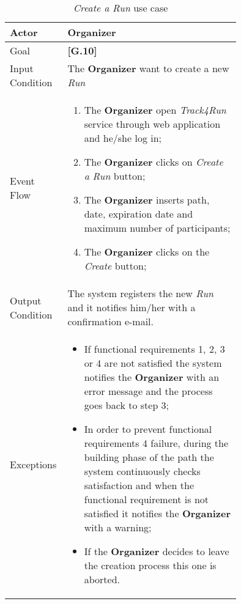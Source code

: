 \begin{center}
\begin{table}
\begin{tabular}{ | l | p{0.75\linewidth} | }
  \hline
    Actor & \textbf{Organizer} \\ \hline
    Goal & \textbf{[G.10]} \\ \hline
    Input Condition & The \textbf{Organizer} want to create a new \textit{Run} \\ \hline
    Event Flow & \begin{minipage}[t]{0.7\textwidth}
      \begin{enumerate}
        \item The \textbf{Organizer} open \textit{Track4Run} service through web application and he/she log in;
        \item The \textbf{Organizer} clicks on \textit{Create a Run} button;
        \item The \textbf{Organizer} inserts path, date, expiration date and maximum number of participants;
        \item The \textbf{Organizer} clicks on the \textit{Create} button;
      \end{enumerate}
    \smallskip
  \end{minipage} \\ \hline
  Output Condition & The system registers the new \textit{Run} and it notifies him/her with a confirmation e-mail. \\ \hline
  Exceptions & \begin{minipage}[t]{0.7\textwidth}
    \begin{itemize}
      \smallskip
      \item If functional requirements 1, 2, 3 or 4 are not satisfied the system notifies the \textbf{Organizer} with an error message and the process goes back to step 3;
      \item In order to prevent functional requirements 4 failure, during the building phase of the path the system continuously checks satisfaction and when the functional requirement is not satisfied it notifies the \textbf{Organizer} with a warning;
      \item If the \textbf{Organizer} decides to leave the creation process this one is aborted.
    \end{itemize}
    \smallskip
  \end{minipage}  \\ \hline
\end{tabular}
\caption{\textit{Create a Run} use case}
\label{table:createRunTable}
\end{table}
\end{center}
